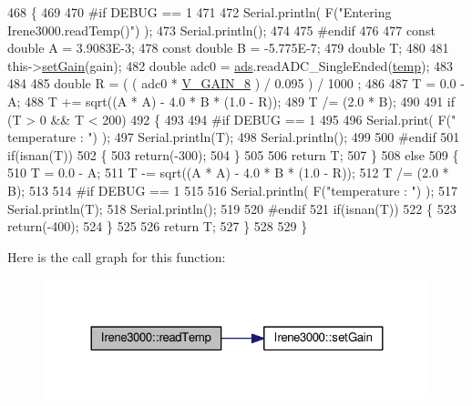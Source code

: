 \begin{DoxyCode}
468 \{
469 
470 \textcolor{preprocessor}{#if DEBUG == 1 }
471 
472     Serial.println( F(\textcolor{stringliteral}{"Entering Irene3000.readTemp()"}) );
473     Serial.println();
474 
475 \textcolor{preprocessor}{#endif}
476 
477     \textcolor{keyword}{const} \textcolor{keywordtype}{double} A = 3.9083E-3;
478     \textcolor{keyword}{const} \textcolor{keywordtype}{double} B = -5.775E-7;
479     \textcolor{keywordtype}{double} T;
480 
481     this->\hyperlink{classIrene3000_aff7c5da186b388e7272e63ff88a20c34}{setGain}(gain);
482     \textcolor{keywordtype}{double} adc0 = \hyperlink{classIrene3000_a1215e77ba761c9908d80d691f149e135}{ads}.readADC\_SingleEnded(\hyperlink{Irene3000_8h_a5905d48604152cf57aa6bfa087b49173}{temp});
483 
484 
485     \textcolor{keywordtype}{double} R = ( ( adc0 * \hyperlink{Irene3000_8h_ab7ab16df599d3f0ce29e12791a504891}{V\_GAIN\_8} ) / 0.095 ) / 1000 ;
486 
487     T = 0.0 - A;
488     T += sqrt((A * A) - 4.0 * B * (1.0 - R));
489     T /= (2.0 * B);
490 
491     \textcolor{keywordflow}{if} (T > 0 && T < 200) 
492     \{
493 
494 \textcolor{preprocessor}{    #if DEBUG == 1 }
495 
496         Serial.print( F(\textcolor{stringliteral}{" temperature : "}) );
497         Serial.println(T);
498         Serial.println();
499     
500 \textcolor{preprocessor}{    #endif }
501         \textcolor{keywordflow}{if}(isnan(T))
502         \{
503             \textcolor{keywordflow}{return}(-300);           
504         \}
505 
506         \textcolor{keywordflow}{return} T;
507     \}
508     \textcolor{keywordflow}{else} 
509     \{
510         T = 0.0 - A;
511         T -= sqrt((A * A) - 4.0 * B * (1.0 - R));
512         T /= (2.0 * B);
513     
514 \textcolor{preprocessor}{    #if DEBUG == 1 }
515     
516         Serial.println( F(\textcolor{stringliteral}{"temperature : "}) );
517         Serial.println(T);
518         Serial.println();
519     
520 \textcolor{preprocessor}{    #endif}
521         \textcolor{keywordflow}{if}(isnan(T))
522         \{
523             \textcolor{keywordflow}{return}(-400);           
524         \}
525 
526         \textcolor{keywordflow}{return} T;
527     \}
528 
529 \}
\end{DoxyCode}
Here is the call graph for this function\+:
\nopagebreak
\begin{figure}[H]
\begin{center}
\leavevmode
\includegraphics[width=324pt]{classIrene3000_a94ad40f281d83ad1be20bf1edd6fe802_cgraph}
\end{center}
\end{figure}
